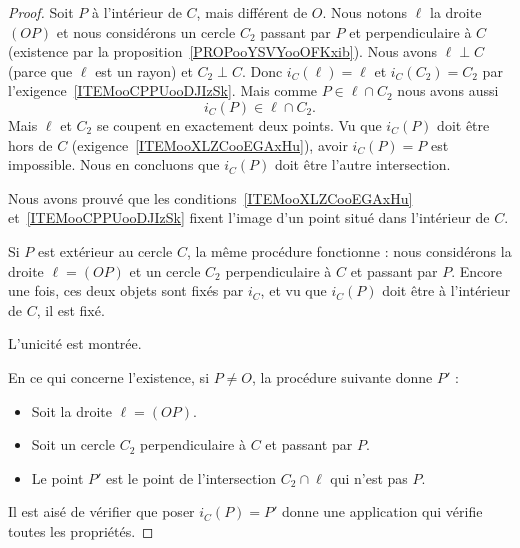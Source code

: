 \begin{proof}
    Soit \( P\) à l'intérieur de \( C\), mais différent de \( O\). Nous notons \( \ell\) la droite \( (OP)\) et nous considérons un cercle \( C_2\) passant par \( P\) et perpendiculaire à \( C\) (existence par la proposition~\ref{PROPooYSVYooOFKxib}). Nous avons \( \ell\perp C\) (parce que \( \ell\) est un rayon) et \( C_2\perp C\). Donc \( i_C(\ell)=\ell\) et \( i_C(C_2)=C_2\) par l'exigence~\ref{ITEMooCPPUooDJIzSk}. Mais comme \( P\in\ell\cap C_2 \) nous avons aussi
    \begin{equation}
        i_C(P)\in \ell\cap C_2.
    \end{equation}
    Mais \( \ell\) et \( C_2\) se coupent en exactement deux points. Vu que \( i_C(P)\) doit être hors de \( C\) (exigence~\ref{ITEMooXLZCooEGAxHu}), avoir \( i_C(P)=P\) est impossible. Nous en concluons que \( i_C(P)\) doit être l'autre intersection.

    Nous avons prouvé que les conditions~\ref{ITEMooXLZCooEGAxHu} et~\ref{ITEMooCPPUooDJIzSk} fixent l'image d'un point situé dans l'intérieur de \( C\).

    Si \( P\) est extérieur au cercle $C$, la même procédure fonctionne : nous considérons la droite \( \ell=(OP)\) et un cercle \( C_2\) perpendiculaire à \( C\) et passant par \( P\). Encore une fois, ces deux objets sont fixés par \( i_C\), et vu que \( i_C(P)\) doit être à l'intérieur de \( C\), il est fixé.

    L'unicité est montrée.

    En ce qui concerne l'existence, si \( P\neq O\), la procédure suivante donne \( P'\) :
    \begin{itemize}
        \item Soit la droite \( \ell=(OP)\).
        \item Soit un cercle \( C_2\) perpendiculaire à \( C\) et passant par \( P\).
        \item Le point \( P'\) est le point de l'intersection \( C_2\cap\ell\) qui n'est pas \( P\).
    \end{itemize}
    Il est aisé de vérifier que poser \( i_C(P)=P'\) donne une application qui vérifie toutes les propriétés.
\end{proof}


